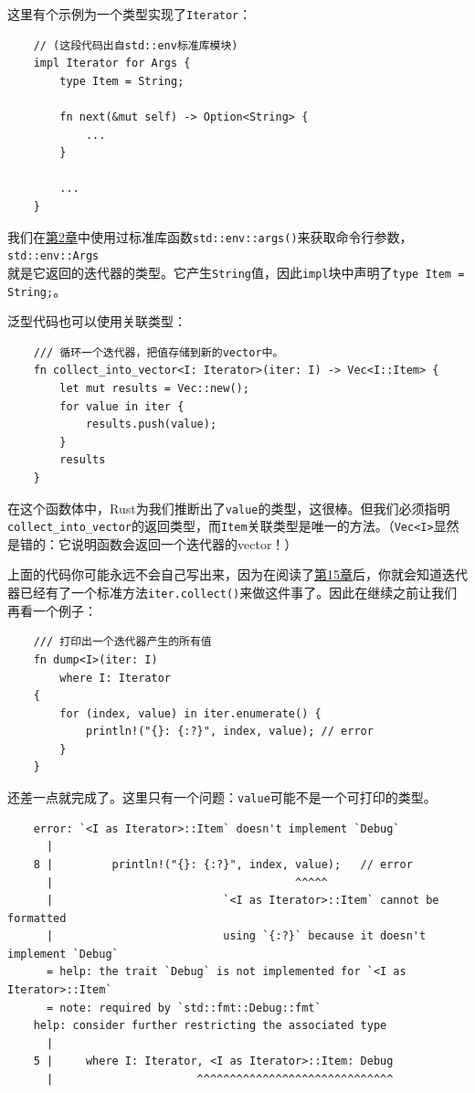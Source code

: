 这里有个示例为一个类型实现了\texttt{Iterator}：
\begin{verbatim}
    // (这段代码出自std::env标准库模块)
    impl Iterator for Args {
        type Item = String;

        fn next(&mut self) -> Option<String> {
            ...
        }

        ...
    }
\end{verbatim}

我们在\hyperref[ch02]{第2章}中使用过标准库函数\texttt{std::env::args()}来获取命令行参数，\texttt{std::env::Args}\\
就是它返回的迭代器的类型。它产生\texttt{String}值，因此\texttt{impl}块中声明了\texttt{type Item = String;}。

泛型代码也可以使用关联类型：
\begin{verbatim}
    /// 循环一个迭代器，把值存储到新的vector中。
    fn collect_into_vector<I: Iterator>(iter: I) -> Vec<I::Item> {
        let mut results = Vec::new();
        for value in iter {
            results.push(value);
        }
        results
    }
\end{verbatim}

在这个函数体中，Rust为我们推断出了\texttt{value}的类型，这很棒。但我们必须指明\\
\texttt{collect\_into\_vector}的返回类型，而\texttt{Item}关联类型是唯一的方法。（\texttt{Vec<I>}显然是错的：它说明函数会返回一个迭代器的vector！）

上面的代码你可能永远不会自己写出来，因为在阅读了\hyperref[ch15]{第15章}后，你就会知道迭代器已经有了一个标准方法\texttt{iter.collect()}来做这件事了。因此在继续之前让我们再看一个例子：
\begin{verbatim}
    /// 打印出一个迭代器产生的所有值
    fn dump<I>(iter: I)
        where I: Iterator
    {
        for (index, value) in iter.enumerate() {
            println!("{}: {:?}", index, value); // error
        }
    }
\end{verbatim}

还差一点就完成了。这里只有一个问题：\texttt{value}可能不是一个可打印的类型。
\begin{verbatim}
    error: `<I as Iterator>::Item` doesn't implement `Debug`
      |
    8 |         println!("{}: {:?}", index, value);   // error
      |                                     ^^^^^
      |                          `<I as Iterator>::Item` cannot be formatted
      |                          using `{:?}` because it doesn't implement `Debug`
      = help: the trait `Debug` is not implemented for `<I as Iterator>::Item`
      = note: required by `std::fmt::Debug::fmt`
    help: consider further restricting the associated type
      |
    5 |     where I: Iterator, <I as Iterator>::Item: Debug
      |                      ^^^^^^^^^^^^^^^^^^^^^^^^^^^^^^
\end{verbatim}

